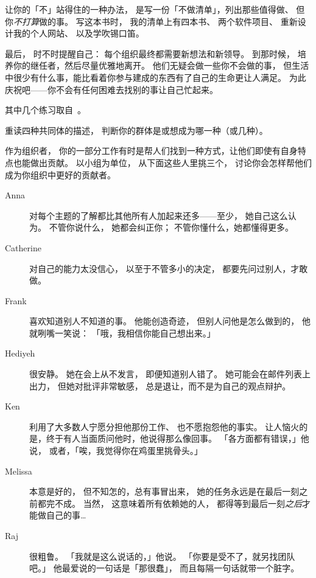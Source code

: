让你的「不」站得住的一种办法，
是写一份「不做清单」，列出那些值得做、
但你\emph{不打算}做的事。
写这本书时，
我的清单上有四本书、
两个软件项目、
重新设计我的个人网站、
以及学吹锡口笛。

最后，
时不时提醒自己：
每个组织最终都需要新想法和新领导。
到那时候，
培养你的继任者，然后尽量优雅地离开。
他们无疑会做一些你不会做的事，
但生活中很少有什么事，能比看着你参与建成的东西有了自己的生命更让人满足。
为此庆祝吧——你不会有任何困难去找别的事让自己忙起来。


其中几个练习取自~\cite{Brow2007}。


重读四种共同体的描述，
判断你的群体是或想成为哪一种（或几种）。


作为组织者，
你的一部分工作有时是帮人们找到一种方式，让他们即使有自身特点也能做出贡献。
以小组为单位，
从下面这些人里挑三个，
讨论你会怎样帮他们成为你组织中更好的贡献者。

\begin{description}

\item[Anna]
  对每个主题的了解都比其他所有人加起来还多——至少，
  她自己这么认为。
  不管你说什么，
  她都会纠正你；
  不管你懂什么，她都懂得更多。

\item[Catherine]
  对自己的能力太没信心，
  以至于不管多小的决定，
  都要先问过别人，才敢做。

\item[Frank]
  喜欢知道别人不知道的事。
  他能创造奇迹，
  但别人问他是怎么做到的，
  他就咧嘴一笑说：
  「哦，我相信你能自己想出来。」

\item[Hediyeh]
  很安静。
  她在会上从不发言，
  即便知道别人错了。
  她可能会在邮件列表上出力，
  但她对批评非常敏感，
  总是退让，而不是为自己的观点辩护。

\item[Ken]
  利用了大多数人宁愿分担他那份工作、
  也不愿抱怨他的事实。
  让人恼火的是，终于有人当面质问他时，他说得那么像回事。
  「各方面都有错误，」他说，
  或者，「唉，我觉得你在鸡蛋里挑骨头。」

\item[Melissa]
  本意是好的，
  但不知怎的，总有事冒出来，
  她的任务永远是在最后一刻之前都完不成。
  当然，
  这意味着所有依赖她的人，
  都得等到最后一刻\emph{之后}才能做自己的事{\ldots}

\item[Raj]
  很粗鲁。
  「我就是这么说话的，」他说。
  「你要是受不了，就另找团队吧。」
  他最爱说的一句话是「那很蠢」，
  而且每隔一句话就带一个脏字。

\end{description}

